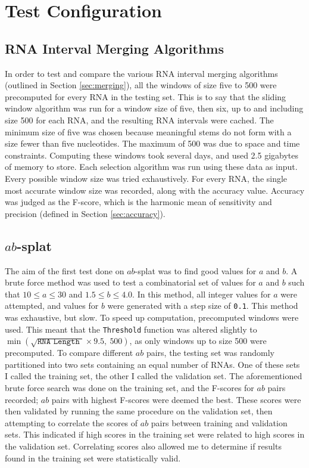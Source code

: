 \documentclass{cshonours}
\begin{document}
\section{Test Configuration}

\subsection{RNA Interval Merging Algorithms}
In order to test and compare the various RNA interval merging algorithms (outlined in Section \ref{sec:merging}), all the windows of size five to 500 were precomputed for every RNA in the testing set. This is to say that the sliding window algorithm was run for a window size of five, then six, up to and including size 500 for each RNA, and the resulting RNA intervals were cached. The minimum size of five was chosen because meaningful stems do not form with a size fewer than five nucleotides. The maximum of 500 was due to space and time constraints. Computing these windows took several days, and used 2.5 gigabytes of memory to store. Each selection algorithm was run using these data as input. Every possible window size was tried exhaustively. For every RNA, the single most accurate window size was recorded, along with the accuracy value. Accuracy was judged as the F-score, which is the harmonic mean of sensitivity and precision (defined in Section \ref{sec:accuracy}).


\subsection{$ab$-splat}
\label{sec:absplatmethod}
The aim of the first test done on $ab$-splat was to find good values for $a$ and $b$. A brute force method was used to test a combinatorial set of values for $a$ and $b$ such that $10 \leq a \leq 30$ and $1.5 \leq b \leq 4.0$. In this method, all integer values for $a$ were attempted, and values for $b$ were generated with a step size of \texttt{0.1}. This method was exhaustive, but slow. To speed up computation, precomputed windows were used. This meant that the \texttt{Threshold} function was altered slightly to $\min(\sqrt{ \texttt {RNA Length } } \times 9.5, \: 500)$, as only windows up to size 500 were precomputed. To compare different $ab$ pairs, the testing set was randomly partitioned into two sets containing an equal number of RNAs. One of these sets I called the training set, the other I called the validation set. The aforementioned brute force search was done on the training set, and the F-scores for $ab$ pairs recorded; $ab$ pairs with highest F-scores were deemed the best. These scores were then validated by running the same procedure on the validation set, then attempting to correlate the scores of $ab$ pairs between training and validation sets. This  indicated if high scores in the training set were related to high scores in the validation set. Correlating scores also allowed me to determine if results found in the training set were statistically valid.
\end{document}
